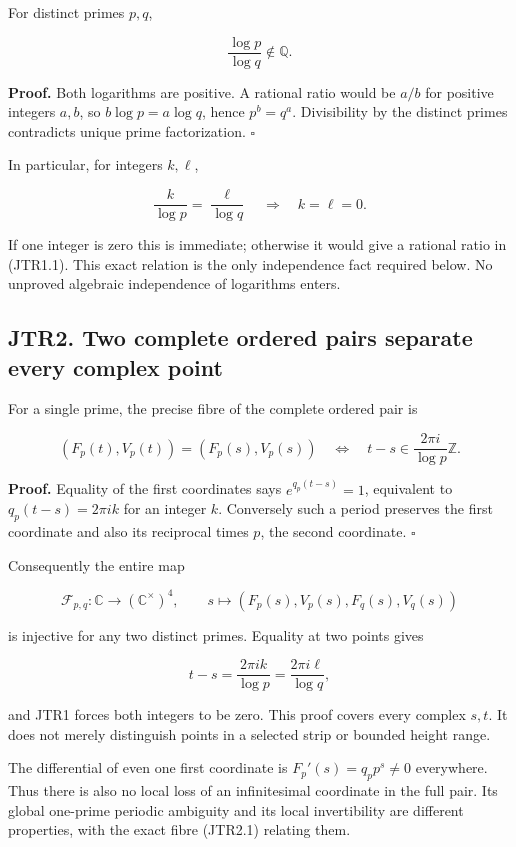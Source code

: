 \documentclass[
]{article}
\begin{document}
For distinct primes \(p,q\),

\[
\frac{\log p}{\log q}\notin\mathbb Q.
\tag{JTR1.1}
\]

\textbf{Proof.} Both logarithms are positive. A rational ratio would be
\(a/b\) for positive integers \(a,b\), so \(b\log p=a\log q\), hence
\(p^b=q^a\). Divisibility by the distinct primes contradicts unique
prime factorization. \(\square\)

In particular, for integers \(k,\ell\),

\[
\frac{k}{\log p}=\frac{\ell}{\log q}
\quad\Longrightarrow\quad k=\ell=0.
\tag{JTR1.2}
\]

If one integer is zero this is immediate; otherwise it would give a
rational ratio in (JTR1.1). This exact relation is the only independence
fact required below. No unproved algebraic independence of logarithms
enters.

\subsection{JTR2. Two complete ordered pairs separate every complex
point}\label{jtr2.-two-complete-ordered-pairs-separate-every-complex-point}

For a single prime, the precise fibre of the complete ordered pair is

\[
(F_p(t),V_p(t))=(F_p(s),V_p(s))
\quad\Longleftrightarrow\quad
t-s\in\frac{2\pi i}{\log p}\mathbb Z.
\tag{JTR2.1}
\]

\textbf{Proof.} Equality of the first coordinates says
\(e^{q_p(t-s)}=1\), equivalent to \(q_p(t-s)=2\pi i k\) for an integer
\(k\). Conversely such a period preserves the first coordinate and also
its reciprocal times \(p\), the second coordinate. \(\square\)

Consequently the entire map

\[
\mathcal F_{p,q}:\mathbb C\longrightarrow(\mathbb C^\times)^4,
\qquad s\longmapsto(F_p(s),V_p(s),F_q(s),V_q(s))
\tag{JTR2.2}
\]

is injective for any two distinct primes. Equality at two points gives

\[
t-s=\frac{2\pi i k}{\log p}
=\frac{2\pi i\ell}{\log q},
\]

and JTR1 forces both integers to be zero. This proof covers every
complex \(s,t\). It does not merely distinguish points in a selected
strip or bounded height range.

The differential of even one first coordinate is \(F_p'(s)=q_p p^s\ne0\)
everywhere. Thus there is also no local loss of an infinitesimal
coordinate in the full pair. Its global one-prime periodic ambiguity and
its local invertibility are different properties, with the exact fibre
(JTR2.1) relating them.
\end{document}
